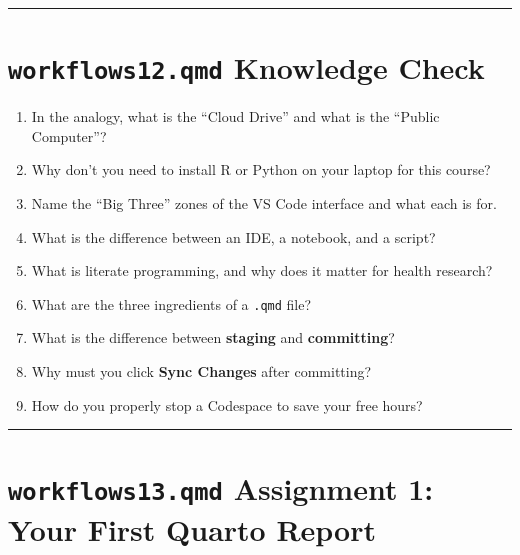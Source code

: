 \documentclass[
  letterpaper,
  DIV=11,
  numbers=noendperiod,
  oneside]{scrreprt}
\providecommand{\tightlist}{%
  \setlength{\itemsep}{0pt}\setlength{\parskip}{0pt}}
\begin{document}
\begin{center}\rule{0.5\linewidth}{0.5pt}\end{center}

\section*{\texorpdfstring{\texttt{workflows12.qmd} Knowledge
Check}{workflows12.qmd Knowledge Check}}\label{workflows12.qmd-knowledge-check}


\begin{enumerate}
\def\labelenumi{\arabic{enumi}.}
\tightlist
\item
  In the analogy, what is the ``Cloud Drive'' and what is the ``Public
  Computer''?
\item
  Why don't you need to install R or Python on your laptop for this
  course?
\item
  Name the ``Big Three'' zones of the VS Code interface and what each is
  for.
\item
  What is the difference between an IDE, a notebook, and a script?
\item
  What is literate programming, and why does it matter for health
  research?
\item
  What are the three ingredients of a \texttt{.qmd} file?
\item
  What is the difference between \textbf{staging} and
  \textbf{committing}?
\item
  Why must you click \textbf{Sync Changes} after committing?
\item
  How do you properly stop a Codespace to save your free hours?
\end{enumerate}

\begin{center}\rule{0.5\linewidth}{0.5pt}\end{center}

\section*{\texorpdfstring{\texttt{workflows13.qmd} Assignment 1: Your
First Quarto
Report}{workflows13.qmd Assignment 1: Your First Quarto Report}}\label{workflows13.qmd-assignment-1-your-first-quarto-report}
\end{document}
